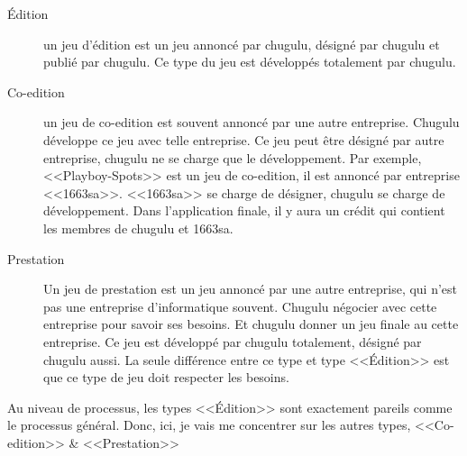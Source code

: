 \begin{description}
	\item[Édition] un jeu d'édition est un jeu annoncé par chugulu, désigné par chugulu et publié par chugulu. Ce type du jeu est développés totalement par chugulu.
	\item[Co-edition] un jeu de co-edition est souvent annoncé par une autre entreprise. Chugulu développe ce jeu avec telle entreprise. Ce jeu peut être désigné par autre entreprise, chugulu ne se charge que le développement. Par exemple, <<Playboy-Spots>> est un jeu de co-edition, il est annoncé par entreprise <<1663sa>>. <<1663sa>> se charge de désigner, chugulu se charge de développement. Dans l'application finale, il y aura un crédit qui contient les membres de chugulu et 1663sa.
	\item[Prestation] Un jeu de prestation est un jeu annoncé par une autre entreprise, qui n'est pas une entreprise d'informatique souvent. Chugulu négocier avec cette entreprise pour savoir ses besoins. Et chugulu donner un jeu finale au cette entreprise. Ce jeu est développé par chugulu totalement, désigné par chugulu aussi. La seule différence entre ce type et type <<Édition>> est que ce type de jeu doit respecter les besoins.
\end{description}

Au niveau de processus, les types <<Édition>> sont exactement pareils comme le processus général. Donc, ici, je vais me concentrer sur les autres types, <<Co-edition>> \& <<Prestation>>


